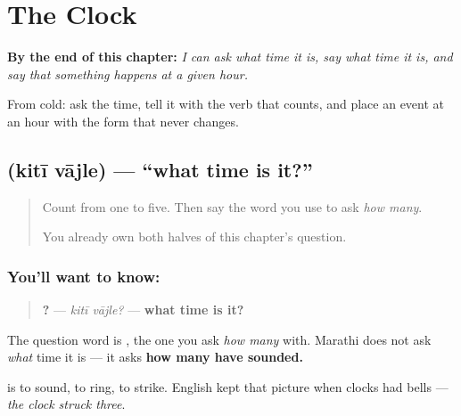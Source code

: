 
\chapter{The Clock}
\label{ch:mr-ghadyal}

\begin{chapteropening}
\textbf{By the end of this chapter:} \emph{I can ask what time it is, say what time it is, and say that something happens at a given hour.}

From cold: ask the time, tell it with the verb that counts, and place an event at an hour with the form that never changes.
\end{chapteropening}

\section[\texorpdfstring{\mr{किती} \mr{वाजले} (kitī vājle)}{किती वाजले (kitī vājle)}]{  (kitī vājle) — \textquotedblleft{}what time is it?\textquotedblright{}}

\label{lesson:MR-C67-vajle}



\begin{quote}
Count from one to five. Then say the word you use to ask \emph{how many}.

You already own both halves of this chapter's question.
\end{quote}

\subsection*{You'll want to know:  }
\begin{quote}
\textbf{ ?} — \emph{kitī vājle?} — \textbf{what time is it?}
\end{quote}

The question word is \textbf{}, the one you ask \emph{how many} with. Marathi does not ask \emph{what} time it is — it asks \textbf{how many have sounded.}

\textbf{} is to sound, to ring, to strike. English kept that picture when clocks had bells — \emph{the clock struck three}.

